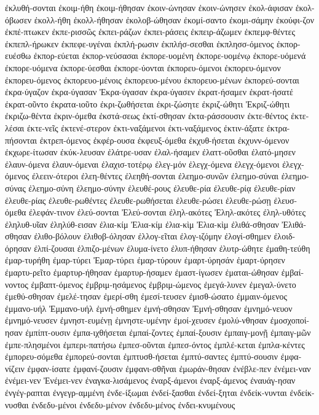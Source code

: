 {ἐκλυθή-σονται
ἐκοιμ-ήθη
ἐκοιμ-ήθησαν
ἐκοιν-ώνησαν
ἐκοιν-ώνησεν
ἐκολ-άφισαν
ἐκολ-όβωσεν
ἐκολλ-ήθη
ἐκολλ-ήθησαν
ἐκολοβ-ώθησαν
ἐκομί-σαντο
ἐκομι-σάμην
ἐκούφι-ζον
ἐκπέ-πτωκεν
ἐκπε-ρισσῶς
ἐκπει-ράζων
ἐκπει-ράσεις
ἐκπειρ-άζωμεν
ἐκπεμφ-θέντες
ἐκπεπλ-ήρωκεν
ἐκπεφε-υγέναι
ἐκπλή-ρωσιν
ἐκπλήσ-σεσθαι
ἐκπλησσ-όμενος
ἐκπορ-ευέσθω
ἐκπορ-εύεται
ἐκπορ-νεύσασαι
ἐκπορε-υομένη
ἐκπορε-υομένῳ
ἐκπορε-υόμενά
ἐκπορε-υόμενα
ἐκπορε-ύεσθαι
ἐκπορε-ύονται
ἐκπορευ-όμενοι
ἐκπορευ-όμενον
ἐκπορευ-όμενος
ἐκπορευο-μένοις
ἐκπορευο-μένου
ἐκπορευο-μένων
ἐκπορεύ-σονται
ἐκρα-ύγαζον
ἐκρα-ύγασαν
Ἐκρα-ύγασαν
ἐκρα-ύγασεν
ἐκρατ-ήσαμεν
ἐκρατ-ήσατέ
ἐκρατ-οῦντο
ἐκρατα-ιοῦτο
ἐκρι-ζωθήσεται
ἐκρι-ζώσητε
ἐκριζ-ώθητι
Ἐκριζ-ώθητι
ἐκριζω-θέντα
ἐκριν-όμεθα
ἐκστά-σεως
ἐκτί-σθησαν
ἐκτα-ράσσουσιν
ἐκτε-θέντος
ἐκτε-λέσαι
ἐκτε-νεῖς
ἐκτενέ-στερον
ἐκτι-ναξάμενοι
ἐκτι-ναξάμενος
ἐκτιν-άξατε
ἐκτρα-πήσονται
ἐκτρεπ-όμενος
ἐκφέρ-ουσα
ἐκφευξ-όμεθα
ἐκχυθ-ήσεται
ἐκχυνν-όμενον
ἐκχωρε-ίτωσαν
ἐκύκ-λευσαν
ἐλάτρε-υσαν
ἐλαλ-ήσαμεν
ἐλαττ-οῦσθαι
ἐλατό-μησεν
ἐλαυν-όμενα
ἐλαυν-όμεναι
ἐλαχισ-τοτέρῳ
ἐλεγ-μόν
ἐλεγχ-όμενα
ἐλεγχ-όμενοι
ἐλεγχ-όμενος
ἐλεειν-ότεροι
ἐλεη-θέντες
ἐλεηθή-σονται
ἐλεημο-συνῶν
ἐλεημο-σύναι
ἐλεημο-σύνας
ἐλεημο-σύνη
ἐλεημο-σύνην
ἐλευθέ-ρους
ἐλευθε-ρία
ἐλευθε-ρίᾳ
ἐλευθε-ρίαν
ἐλευθε-ρίας
ἐλευθε-ρωθέντες
ἐλευθε-ρωθήσεται
ἐλευθε-ρώσει
ἐλευθε-ρώσῃ
ἐλευσ-όμεθα
ἐλεφάν-τινον
ἐλεύ-σονται
Ἐλεύ-σονται
ἐληλ-ακότες
Ἐληλ-ακότες
ἐληλ-υθότες
ἐληλυθ-υῖαν
ἐληλύθ-εισαν
ἐλια-κίμ
Ἐλια-κίμ
ἐλια-κὶμ
Ἐλια-κὶμ
ἐλιθά-σθησαν
Ἐλιθά-σθησαν
ἐλιθο-βόλουν
ἐλιθοβ-όλησαν
ἐλλογ-εῖται
ἐλογ-ιζόμην
ἐλογί-σθημεν
ἐλοιδ-όρησαν
ἐλπί-ζουσαι
ἐλπιζο-μένων
ἐλυμα-ίνετο
ἐλυπ-ήθησαν
ἐλυτρ-ώθητε
ἐμαθη-τεύθη
ἐμαρ-τυρήθη
ἐμαρ-τύρει
Ἐμαρ-τύρει
ἐμαρ-τύρουν
ἐμαρτ-ύρησάν
ἐμαρτ-ύρησεν
ἐμαρτυ-ρεῖτο
ἐμαρτυρ-ήθησαν
ἐμαρτυρ-ήσαμεν
ἐμαστ-ίγωσεν
ἐμαται-ώθησαν
ἐμβαί-νοντος
ἐμβαπτ-όμενος
ἐμβριμ-ησάμενος
ἐμβριμ-ώμενος
ἐμεγά-λυνεν
ἐμεγαλ-ύνετο
ἐμεθύ-σθησαν
ἐμελέ-τησαν
ἐμερί-σθη
ἐμεσί-τευσεν
ἐμισθ-ώσατο
ἐμμαιν-όμενος
ἐμμανο-υήλ
Ἐμμανο-υήλ
ἐμνή-σθημεν
ἐμνή-σθησαν
Ἐμνή-σθησαν
ἐμνημό-νευον
ἐμνημό-νευσεν
ἐμνηστ-ευμένῃ
ἐμνηστε-υμένην
ἐμοί-χευσεν
ἐμολύ-νθησαν
ἐμοσχοποί-ησαν
ἐμπίπτ-ουσιν
ἐμπα-ιχθήσεται
ἐμπαί-ζοντες
ἐμπαί-ξουσιν
ἐμπαιγ-μονῇ
ἐμπαιγ-μῶν
ἐμπε-πλησμένοι
ἐμπερι-πατήσω
ἐμπεσ-οῦνται
ἐμπεσ-όντος
ἐμπλέ-κεται
ἐμπλα-κέντες
ἐμπορευ-σόμεθα
ἐμπορεύ-σονται
ἐμπτυσθ-ήσεται
ἐμπτύ-σαντες
ἐμπτύ-σουσιν
ἐμφα-νίζειν
ἐμφαν-ίσατε
ἐμφανί-ζουσιν
ἐμφανι-σθῆναι
ἐμωράν-θησαν
ἐνέβλε-πεν
ἐνέμει-ναν
ἐνέμει-νεν
Ἐνέμει-νεν
ἐναγκα-λισάμενος
ἐναρξ-άμενοι
ἐναρξ-άμενος
ἐναυάγ-ησαν
ἐνγέγ-ραπται
ἐνγεγρ-αμμένη
ἐνδε-ίξωμαι
ἐνδεί-ξασθαι
ἐνδεί-ξηται
ἐνδείκ-νυνται
ἐνδείκ-νυσθαι
ἐνδεδυ-μένοι
ἐνδεδυ-μένον
ἐνδεδυ-μένος
ἐνδει-κνυμένους
}
